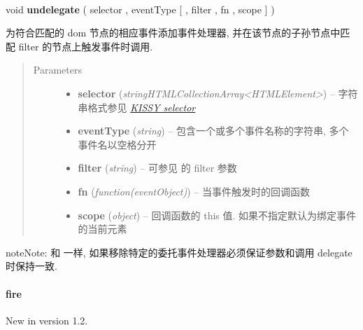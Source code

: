 \documentclass[letterpaper,10pt,english]{sphinxmanual}
\begin{document}
\begin{fulllineitems}
\label{api/core/event/undelegate:Event.undelegate}~
\begin{DUlineblock}{0em}
\item[] void \textbf{undelegate} ( selector ,  eventType {[} , filter , fn  , scope {]} )
\item[] 为符合匹配的 dom 节点的相应事件添加事件处理器, 并在该节点的子孙节点中匹配 filter 的节点上触发事件时调用.
\end{DUlineblock}
\begin{quote}\begin{description}
\item[{Parameters}] \leavevmode\begin{itemize}
\item {}
\textbf{selector} (\emph{string\textbar{}HTMLCollection\textbar{}Array\textless{}HTMLElement\textgreater{}}) -- 字符串格式参见 {\hyperref[api/core/dom/selector:dom-selector]{\emph{KISSY selector}}}

\item {}
\textbf{eventType} (\emph{string}) -- 包含一个或多个事件名称的字符串, 多个事件名以空格分开

\item {}
\textbf{filter} (\emph{string}) -- 可参见 {\hyperref[api/core/dom/filter:DOM.filter]{}} 的 filter 参数

\item {}
\textbf{fn} (\emph{function(eventObject)}) -- 当事件触发时的回调函数

\item {}
\textbf{scope} (\emph{object}) -- 回调函数的 this 值. 如果不指定默认为绑定事件的当前元素

\end{itemize}

\end{description}\end{quote}

\begin{notice}{note}{Note:}
和 {\hyperref[api/core/event/detach:Event.detach]{}} 一样, 如果移除特定的委托事件处理器必须保证参数和调用 delegate 时保持一致.
\end{notice}

\end{fulllineitems}



\paragraph{fire}
\label{api/core/event/fire:fire}\label{api/core/event/fire::doc}New in version 1.2.
\end{document}
